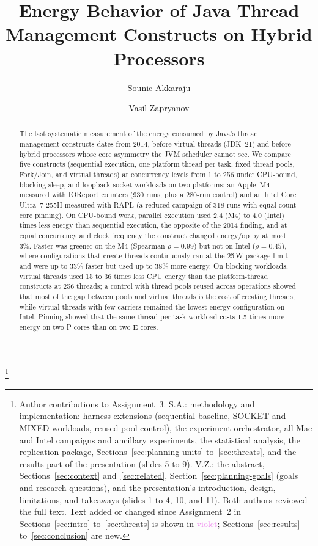 \documentclass[sigconf,nonacm]{acmart}
\newcommand{\upd}[1]{\textcolor{violet}{#1}}
\begin{document}
\title{Energy Behavior of Java Thread Management Constructs on Hybrid Processors}

\author{Sounic Akkaraju}

\author{Vasil Zapryanov}

\thanks{Author contributions to Assignment~3. S.A.: methodology and implementation: harness extensions (sequential baseline, SOCKET and MIXED workloads, reused-pool control), the experiment orchestrator, all Mac and Intel campaigns and ancillary experiments, the statistical analysis, the replication package, Sections~\ref{sec:planning-units} to~\ref{sec:threats}, and the results part of the presentation (slides 5 to 9). V.Z.: the abstract, Sections~\ref{sec:context} and~\ref{sec:related}, Section~\ref{sec:planning-goals} (goals and research questions), and the presentation's introduction, design, limitations, and takeaways (slides 1 to 4, 10, and 11). Both authors reviewed the full text. Text added or changed since Assignment~2 in Sections~\ref{sec:intro} to~\ref{sec:threats} is shown in \upd{violet}; Sections~\ref{sec:results} to~\ref{sec:conclusion} are new.}

\begin{abstract}
The last systematic measurement of the energy consumed by Java's thread management constructs dates from 2014, before virtual threads (JDK~21) and before hybrid processors whose core asymmetry the JVM scheduler cannot see. We compare five constructs (sequential execution, one platform thread per task, fixed thread pools, Fork/Join, and virtual threads) at concurrency levels from 1 to 256 under CPU-bound, blocking-sleep, and loopback-socket workloads on two platforms: an Apple~M4 measured with IOReport counters (930 runs, plus a 280-run control) and an Intel Core Ultra~7 255H measured with RAPL (a reduced campaign of 318 runs with equal-count core pinning). On CPU-bound work, parallel execution used 2.4 (M4) to 4.0 (Intel) times less energy than sequential execution, the opposite of the 2014 finding, and at equal concurrency and clock frequency the construct changed energy/op by at most 3\%. Faster was greener on the M4 (Spearman $\rho = 0.99$) but not on Intel ($\rho = 0.45$), where configurations that create threads continuously ran at the 25\,W package limit and were up to 33\% faster but used up to 38\% more energy. On blocking workloads, virtual threads used 15 to 36 times less CPU energy than the platform-thread constructs at 256 threads; a control with thread pools reused across operations showed that most of the gap between pools and virtual threads is the cost of creating threads, while virtual threads with few carriers remained the lowest-energy configuration on Intel. Pinning showed that the same thread-per-task workload costs 1.5 times more energy on two P cores than on two E cores.
\end{abstract}
\end{document}
